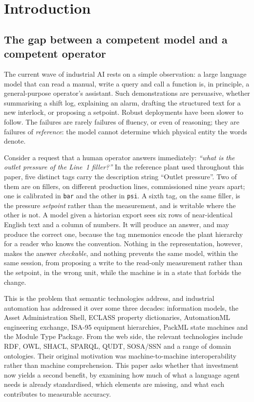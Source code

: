\section{Introduction}
\label{sec:intro}

\subsection{The gap between a competent model and a competent operator}

The current wave of industrial AI rests on a simple observation: a large
language model that can read a manual, write a query and call a function is, in
principle, a general-purpose operator's assistant. Such demonstrations are
persuasive, whether summarising a shift log, explaining an alarm, drafting the
structured text for a new interlock, or proposing a setpoint. Robust deployments
have been slower to follow. The failures are rarely failures of fluency, or even
of reasoning; they are failures of \emph{reference}: the model cannot determine
which physical entity the words denote.

Consider a request that a human operator answers immediately: \emph{``what is
the outlet pressure of the Line~1 filler?''} In the reference plant used
throughout this paper, five distinct tags carry the description string
``Outlet pressure''. Two of them are on fillers, on different production lines,
commissioned nine years apart; one is calibrated in \texttt{bar} and the other
in \texttt{psi}. A sixth tag, on the same filler, is the pressure
\emph{setpoint} rather than the measurement, and is writable where the other is
not. A model given a historian export sees six rows of near-identical English text
and a column of numbers. It will produce an answer, and may produce the correct
one, because the tag mnemonics encode the plant hierarchy for a reader who knows
the convention. Nothing in the representation, however, makes the answer
\emph{checkable}, and nothing prevents the same model, within the same session,
from proposing a write to the read-only measurement rather than the setpoint, in
the wrong unit, while the machine is in a state that forbids the change.

This is the problem that semantic technologies address, and industrial
automation has addressed it over some three decades: \opcua{} information models,
the Asset Administration Shell, ECLASS property dictionaries, AutomationML
engineering exchange, ISA-95 equipment hierarchies, PackML state machines and the
Module Type Package. From the web side, the relevant technologies include RDF,
OWL, SHACL, SPARQL, QUDT, SOSA/SSN and a range of domain ontologies. Their
original motivation was machine-to-machine interoperability rather than machine
comprehension. This paper asks whether that investment now yields a second
benefit, by examining how much of what a language agent needs is already
standardised, which elements are missing, and what each contributes to
measurable accuracy.

